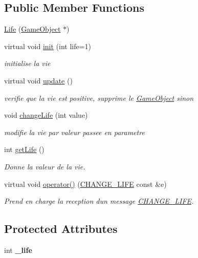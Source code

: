 \subsection*{Public Member Functions}
\begin{DoxyCompactItemize}
\item 
\hyperlink{class_life_ad5a065168648ef6114eee8851c63a9e0}{Life} (\hyperlink{class_game_object}{Game\+Object} $\ast$)
\item 
virtual void \hyperlink{class_life_a38250d67d459d3887e8d5adddf6b5129}{init} (int life=1)
\begin{DoxyCompactList}\small\item\em initialise la vie \end{DoxyCompactList}\item 
\hypertarget{class_life_a0e00f2735584f3ddebb397742b520d3b}{}\label{class_life_a0e00f2735584f3ddebb397742b520d3b} 
virtual void \hyperlink{class_life_a0e00f2735584f3ddebb397742b520d3b}{update} ()
\begin{DoxyCompactList}\small\item\em verifie que la vie est positive, supprime le \hyperlink{class_game_object}{Game\+Object} sinon \end{DoxyCompactList}\item 
void \hyperlink{class_life_a5058223a20871cf287b7f75ce2eb44ef}{change\+Life} (int value)
\begin{DoxyCompactList}\small\item\em modifie la vie par valeur passee en parametre \end{DoxyCompactList}\item 
int \hyperlink{class_life_a6bbbcb718407c98ce6c031c81685a659}{get\+Life} ()
\begin{DoxyCompactList}\small\item\em Donne la valeur de la vie. \end{DoxyCompactList}\item 
virtual void \hyperlink{class_life_ab33e0ff7003ed8c066d61ddb65ffc321}{operator()} (\hyperlink{struct_c_h_a_n_g_e___l_i_f_e}{C\+H\+A\+N\+G\+E\+\_\+\+L\+I\+FE} const \&e)
\begin{DoxyCompactList}\small\item\em Prend en charge la reception d\textquotesingle{}un message \hyperlink{struct_c_h_a_n_g_e___l_i_f_e}{C\+H\+A\+N\+G\+E\+\_\+\+L\+I\+FE}. \end{DoxyCompactList}\end{DoxyCompactItemize}
\subsection*{Protected Attributes}
\begin{DoxyCompactItemize}
\item 
\hypertarget{class_life_a30ed082fad4dd9a0fdf6850ed7b469aa}{}\label{class_life_a30ed082fad4dd9a0fdf6850ed7b469aa} 
int {\bfseries \+\_\+life}
\end{DoxyCompactItemize}
